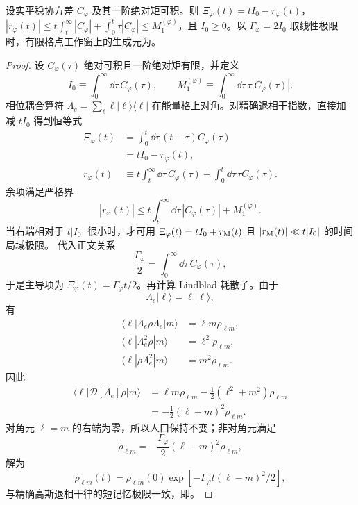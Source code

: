\begin{proposition}[有限一阶相关矩的退相干极限]
设实平稳协方差 $C_\varphi$ 及其一阶绝对矩可积。则 $\Xi_\varphi(t)=tI_0-r_\varphi(t)$，$|r_\varphi(t)|\le t\int_t^\infty|C_\varphi|+\int_0^t\tau|C_\varphi|\le M_1^{(\varphi)}$，且 $I_0\ge0$。以 $\Gamma_\varphi=2I_0$ 取线性极限时，有限格点工作窗上的生成元为。
\end{proposition}
\begin{proof}
设 $C_\varphi(\tau)$ 绝对可积且一阶绝对矩有限，并定义
\begin{equation*}
I_0\equiv\int_0^\infty\dd\tau\,C_\varphi(\tau),
\qquad
M_1^{(\varphi)}\equiv\int_0^\infty\dd\tau\,\tau|C_\varphi(\tau)|.
\end{equation*}
相位耦合算符 $\Lambda_e=\sum_\ell\ell|\ell\rangle\langle\ell|$ 在能量格上对角。对精确退相干指数，直接加减 $tI_0$ 得到恒等式
\begin{align*}
\Xi_\varphi(t)
&=\int_0^t\dd\tau\,(t-\tau)C_\varphi(\tau)\\
&=tI_0-r_\varphi(t),\\
r_\varphi(t)
&\equiv
t\int_t^\infty\dd\tau\,C_\varphi(\tau)
+\int_0^t\dd\tau\,\tau C_\varphi(\tau).
\end{align*}
余项满足严格界
\begin{equation*}
|r_\varphi(t)|
\le
t\int_t^\infty\dd\tau\,|C_\varphi(\tau)|
+M_1^{(\varphi)}.
\end{equation*}
当右端相对于 $t|I_0|$ 很小时，才可用 $\Xi_\varphi(t)=tI_0+r_{\rm M}(t)$ 且 $|r_{\rm M}(t)|\ll t|I_0|$ 的时间局域极限。
代入正文关系
\begin{equation*}
\frac{\Gamma_\varphi}{2}=\int_0^\infty\dd\tau\,C_\varphi(\tau),
\end{equation*}
于是主导项为 $\Xi_\varphi(t)=\Gamma_\varphi t/2$。再计算 Lindblad 耗散子。由于
\begin{equation*}
\Lambda_e|\ell\rangle=\ell|\ell\rangle,
\end{equation*}
有
\begin{align*}
\langle\ell|\Lambda_e\rho\Lambda_e|m\rangle&=\ell m\rho_{\ell m},\\
\langle\ell|\Lambda_e^2\rho|m\rangle&=\ell^2\rho_{\ell m},\\
\langle\ell|\rho\Lambda_e^2|m\rangle&=m^2\rho_{\ell m}.
\end{align*}
因此
\begin{align*}
\langle\ell|\mathcal D[\Lambda_e]\rho|m\rangle
&=\ell m\rho_{\ell m}-\frac12(\ell^2+m^2)\rho_{\ell m}\\
&=-\frac12(\ell-m)^2\rho_{\ell m}.
\end{align*}
对角元 $\ell=m$ 的右端为零，所以人口保持不变；非对角元满足
\begin{equation*}
\dot\rho_{\ell m}=-\frac{\Gamma_\varphi}{2}(\ell-m)^2\rho_{\ell m},
\end{equation*}
解为
\begin{equation*}
\rho_{\ell m}(t)=\rho_{\ell m}(0)\exp[-\Gamma_\varphi t(\ell-m)^2/2],
\end{equation*}
与精确高斯退相干律的短记忆极限一致，即。
\end{proof}



